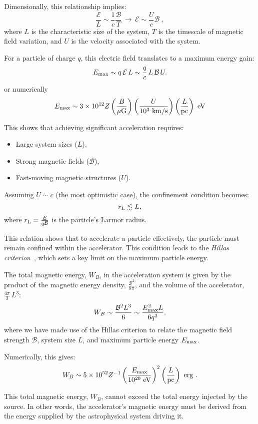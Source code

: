 Dimensionally, this relationship implies:
\[
\frac{\mathcal E}{L} \sim \frac{1}{c} \frac{\mathcal B}{T} \, \longrightarrow \, \mathcal E \sim \frac{U}{c} \mathcal B~,
\]
where \( L \) is the characteristic size of the system, \( T \) is the timescale of magnetic field variation, and \( U \) is the velocity associated with the system.

For a particle of charge \( q \), this electric field translates to a maximum energy gain:
\[
E_{\rm max} \sim q \, \mathcal E \, L \sim \frac{q}{c} \, L \, \mathcal B \, U.
\]
or numerically
\[
E_{\rm max} \sim 3 \times 10^{12} Z \left( \frac{B}{\mu\text{G}} \right) \left( \frac{U}{10^3~\text{km/s}} \right) \left( \frac{L}{\text{pc}} \right)~\text{eV}
\]

This shows that achieving significant acceleration requires:
%
\begin{itemize}
\item Large system sizes (\( L \)),
\item Strong magnetic fields (\( \mathcal B \)),
\item Fast-moving magnetic structures (\( U \)).
\end{itemize}

Assuming \( U \sim c \) (the most optimistic case), the confinement condition becomes:
\[
r_{\rm L} \lesssim L,
\]
where \( r_{\rm L} = \frac{E}{q \mathcal B} \) is the particle's Larmor radius. 

This relation shows that to accelerate a particle effectively, the particle must remain confined within the accelerator. 
%
This condition leads to the \emph{Hillas criterion}~\cite{Hillas1984}, which sets a key limit on the maximum particle energy. 

The total magnetic energy, \( W_B \), in the acceleration system is given by the product of the magnetic energy density, \( \frac{\mathcal{B}^2}{8\pi} \), and the volume of the accelerator, \( \frac{4\pi}{3} \, L^3 \):  
\[
W_B \sim \frac{\mathcal{B}^2 L^3}{6} \sim \frac{E_{\rm max}^2 L}{6 q^2},
\]  
where we have made use of the Hillas criterion to relate the magnetic field strength \( \mathcal{B} \), system size \( L \), and maximum particle energy \( E_{\rm max} \).  

Numerically, this gives:
\[
W_B \sim 5 \times 10^{52} Z^{-1} \left( \frac{E_{\rm max}}{10^{20}~\text{eV}} \right)^2 \left( \frac{L}{\text{pc}} \right)~\text{erg}~.
\]  

This total magnetic energy, \( W_B \), cannot exceed the total energy injected by the source. In other words, the accelerator’s magnetic energy must be derived from the energy supplied by the astrophysical system driving it.

